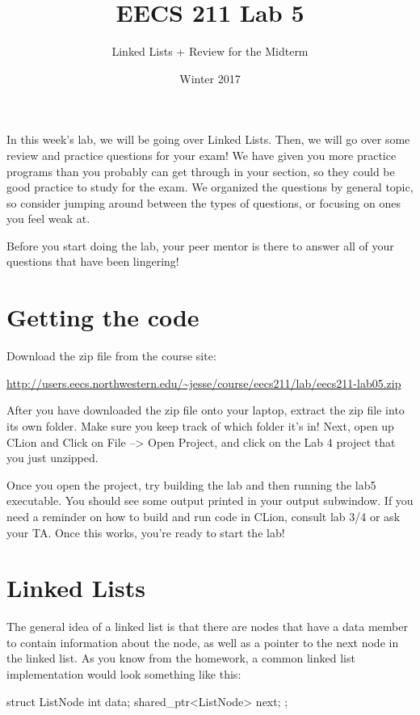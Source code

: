 \documentclass{tufte-handout}
\title{EECS 211 Lab 5}
\author{Linked Lists + Review for the Midterm}
\date{Winter 2017}
\begin{document}
\maketitle

In this week's lab, we will be going over Linked Lists. Then, we will go over some review and practice questions for your exam!  
We have given you more practice programs than you probably can get through in your section, so they could be good practice to study for the exam.
We organized the questions by general topic, so consider jumping around between the types of questions, or focusing on ones you feel weak at.

Before you start doing the lab, your peer mentor is there to answer all of your questions that have been lingering!
\section{Getting the code}
Download the zip file from the course site: \medskip

\url{http://users.eecs.northwestern.edu/~jesse/course/eecs211/lab/eecs211-lab05.zip}

\medskip \noindent
After you have downloaded the zip file onto your laptop, extract the zip file into its own folder. Make sure you keep track of which folder it's in!  Next, open up CLion and Click on File --> Open Project, and click on the Lab 4 project that you just unzipped. 

Once you open the project, try building the lab and then running the lab5 executable. 
You should see some output printed in your output subwindow.
If you need a reminder on how to build and run code in CLion, consult lab 3/4 or ask your TA.
Once this works, you're ready to start the lab!


\section{Linked Lists}
The general idea of a linked list is that there are nodes that have a data member to contain information about the node, as well as a pointer to the next node in the linked list.  
As you know from the homework, a common linked list implementation would look something like this:

\begin{Code}
struct ListNode
{
    int data;
    shared_ptr<ListNode> next;
};
\end{Code}
\end{document}
